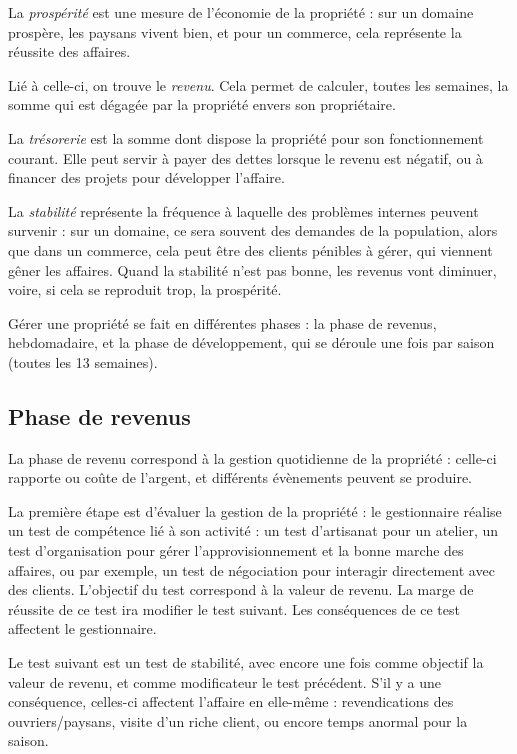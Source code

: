 \documentclass[10pt,a4paper]{book}
\begin{document}
\begin{multicols}{2}
La \emph{prospérité} est une mesure de l'économie de la propriété : sur un domaine prospère, les paysans vivent bien, et pour un commerce, cela représente la réussite des affaires.

Lié à celle-ci, on trouve le \emph{revenu}. Cela permet de calculer, toutes les semaines, la somme qui est dégagée par la propriété envers son propriétaire. 

La \emph{trésorerie} est la somme dont dispose la propriété pour son fonctionnement courant. Elle peut servir à payer des dettes lorsque le revenu est négatif, ou à financer des projets pour développer l'affaire. 

La \emph{stabilité} représente la fréquence à laquelle des problèmes internes peuvent survenir : sur un domaine, ce sera souvent des demandes de la population, alors que dans un commerce, cela peut être des clients pénibles à gérer, qui viennent gêner les affaires. Quand la stabilité n'est pas bonne, les revenus vont diminuer, voire, si cela se reproduit trop, la prospérité.

Gérer une propriété se fait en différentes phases : la phase de revenus, hebdomadaire, et la phase de développement, qui se déroule une fois par saison (toutes les 13 semaines). 

\subsection{Phase de revenus}
La phase de revenu correspond à la gestion quotidienne de la propriété : celle-ci rapporte ou coûte de l'argent, et différents évènements peuvent se produire.

La première étape est d'évaluer la gestion de la propriété : le gestionnaire réalise un test de compétence lié à son activité : un test d'artisanat pour un atelier, un test d'organisation pour gérer l'approvisionnement et la bonne marche des affaires, ou par exemple, un test de négociation pour interagir directement avec des clients. L'objectif du test correspond à la valeur de revenu. La marge de réussite de ce test ira modifier le test suivant. Les conséquences de ce test affectent le gestionnaire.

Le test suivant est un test de stabilité, avec encore une fois comme objectif la valeur de revenu, et comme modificateur le test précédent. S'il y a une conséquence, celles-ci affectent l'affaire en elle-même : revendications des ouvriers/paysans, visite d'un riche client, ou encore temps anormal pour la saison.


\end{multicols}
\end{document}
